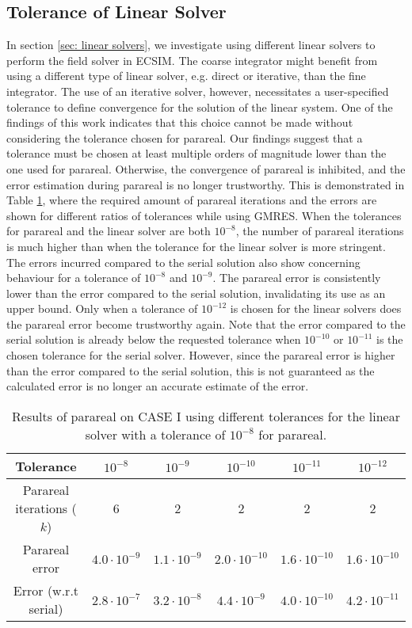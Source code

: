 \subsection{Tolerance of Linear Solver}
\label{sub: tol lin solver}
In section \ref{sec: linear solvers}, we investigate using different linear solvers to perform the field solver in ECSIM. The coarse integrator might benefit from using a different type of linear solver, e.g. direct or iterative, than the fine integrator. 
The use of an iterative solver, however, necessitates a user-specified tolerance to define convergence for the solution of the linear system. One of the findings of this work indicates that this choice cannot be made without considering the tolerance chosen for parareal. Our findings suggest that a tolerance must be chosen at least multiple orders of magnitude lower than the one used for parareal. Otherwise, the convergence of parareal is inhibited, and the error estimation during parareal is no longer trustworthy. This is demonstrated in Table \ref{tab: tolerance_lin_solver_8}, where the required amount of parareal iterations and the errors are shown for different ratios of tolerances while using GMRES. When the tolerances for parareal and the linear solver are both $10^{-8}$, the number of parareal iterations is much higher than when the tolerance for the linear solver is more stringent. The errors incurred compared to the serial solution also show concerning behaviour for a tolerance of $10^{-8}$ and $10^{-9}$. The parareal error is consistently lower than the error compared to the serial solution, invalidating its use as an upper bound. Only when a tolerance of $10^{-12}$ is chosen for the linear solvers does the parareal error become trustworthy again. Note that the error compared to the serial solution is already below the requested tolerance when $10^{-10}$ or $10^{-11}$ is the chosen tolerance for the serial solver. However, since the parareal error is higher than the error compared to the serial solution, this is not guaranteed as the calculated error is no longer an accurate estimate of the error.
\begin{table}[htbp]
    \centering
    \begin{tabular}{|c|c|c|c|c|c|}
        \hline
        \textbf{Tolerance}& $10^{-8}$ & $10^{-9}$ & $10^{-10}$ & $10^{-11}$& $10^{-12}$\\
        \hline
         Parareal iterations ($k$)& 6 & 2 & 2 & 2 & 2\\
         Parareal error & $4.0\cdot10^{-9}$ & $1.1\cdot10^{-9}$ & $2.0\cdot10^{-10}$ & $1.6\cdot10^{-10}$ & $1.6\cdot 10^{-10}$\\
         Error (w.r.t serial) & $2.8\cdot10^{-7}$ & $3.2\cdot10^{-8}$ & $4.4\cdot10^{-9}$ & $4.0\cdot10^{-10}$& $4.2\cdot 10^{-11}$\\
        \hline
    \end{tabular}
    \caption{Results of parareal on CASE I using different tolerances for the linear solver with a tolerance of $10^{-8}$ for parareal.}
    \label{tab: tolerance_lin_solver_8}
\end{table}
